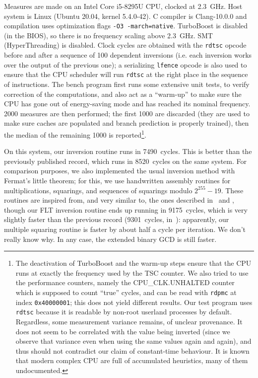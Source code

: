 \documentclass{llncs}
\begin{document}
Measures are made on an Intel Core i5-8295U CPU, clocked at 2.3~GHz.
Host system is Linux (Ubuntu 20.04, kernel 5.4.0-42). C compiler is
Clang-10.0.0 and compilation uses optimization flags
\verb+-O3 -march=native+. TurboBoost is disabled (in the BIOS), so there
is no frequency scaling above 2.3~GHz. SMT (HyperThreading) is disabled.
Clock cycles are obtained with the \verb+rdtsc+ opcode before and after
a sequence of 100 dependent inversions (i.e. each inversion works over
the output of the previous one); a serializing \verb+lfence+ opcode is
also used to ensure that the CPU scheduler will run \verb+rdtsc+ at the
right place in the sequence of instructions. The bench program first
runs some extensive unit tests, to verify correction of the
computations, and also act as a ``warm-up'' to make sure the CPU has
gone out of energy-saving mode and has reached its nominal frequency.
2000 measures are then performed; the first 1000 are discarded (they are
used to make sure caches are populated and branch prediction is properly
trained), then the median of the remaining 1000 is reported\footnote{The
deactivation of TurboBoost and the warm-up steps ensure that the CPU
runs at exactly the frequency used by the TSC counter. We also tried to
use the performance counters, namely the CPU\_CLK.UNHALTED counter which
is supposed to count ``true'' cycles, and can be read with
\texttt{rdpmc} at index \texttt{0x40000001}; this does not yield
different results. Our test program uses \texttt{rdtsc} because it is
readable by non-root userland processes by default. Regardless, some
measurement variance remains, of unclear provenance. It does not seem to
be correlated with the value being inverted (since we observe that
variance even when using the same values again and again), and thus
should not contradict our claim of constant-time behaviour. It is known
that modern complex CPU are full of accumulated heuristics, many of them
undocumented.}.

On this system, our inversion routine runs in 7490~cycles. This is
better than the previously published record\cite{BerYan2019}, which runs
in 8520~cycles on the same system. For comparison purposes, we also
implemented the usual inversion method with Fermat's little theorem; for
this, we use handwritten assembly routines for multiplications,
squarings, and sequences of squarings modulo $2^{255}-19$. These
routines are inspired from, and very similar to, the ones described
in~\cite{OliLopHisFazRod2017} and \cite{NatSar2018}, though our FLT
inversion routine ends up running in 9175~cycles, which is very slightly
faster than the previous record (9301~cycles, in~\cite{NatSar2018}):
apparently, our multiple squaring routine is faster by about half a
cycle per iteration. We don't really know why. In any case, the extended
binary GCD is still faster.
\end{document}
